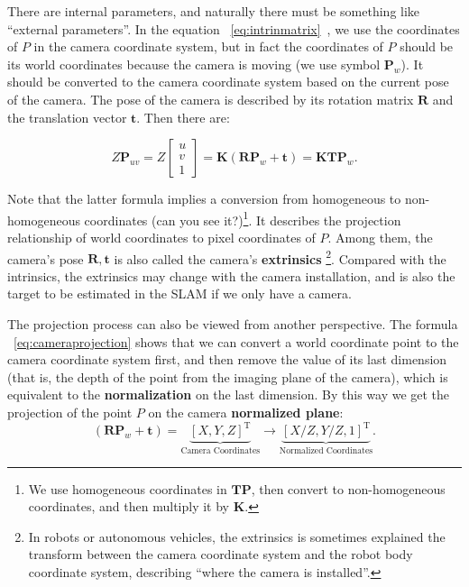 There are internal parameters, and naturally there must be something like ``external parameters''. In the equation ~\eqref{eq:intrinmatrix}~, we use the coordinates of $P$ in the camera coordinate system, but in fact the  coordinates of $P$ should be its world coordinates because the camera is moving (we use symbol $\mathbf{P}_w$). It should be converted to the camera coordinate system based on the current pose of the camera. The pose of the camera is described by its rotation matrix $\mathbf{R}$ and the translation vector $\mathbf{t}$. Then there are:

\begin{equation}
\label{eq:cameraprojection}
Z \mathbf{P}_{uv}=
Z \left[ \begin{array}{l}
u\\
v\\
1
\end{array} \right] = \mathbf{K} \left( {\mathbf{R}{ \mathbf{P}_w} + \mathbf{t}} \right) =  \mathbf{K} \mathbf{T} \mathbf{P}_w .
\end{equation}

Note that the latter formula implies a conversion from homogeneous to non-homogeneous coordinates (can you see it?)\footnote{We use homogeneous coordinates in $\mathbf{T}\mathbf{P}$, then convert to non-homogeneous coordinates, and then multiply it by $\mathbf{K}$. }. It describes the projection relationship of world coordinates to pixel coordinates of $P$. Among them, the camera's pose $\mathbf{R}, \mathbf{t}$ is also called the camera's \textbf{extrinsics} \footnote{In robots or autonomous vehicles, the extrinsics is sometimes explained the transform between the camera coordinate system and the robot body coordinate system, describing ``where the camera is installed''. }. Compared with the intrinsics, the extrinsics may change with the camera installation, and is also the target to be estimated in the SLAM if we only have a camera.

The projection process can also be viewed from another perspective. The formula ~\eqref{eq:cameraprojection} shows that we can convert a world coordinate point to the camera coordinate system first, and then remove the value of its last dimension (that is, the depth of the point from the imaging plane of the camera), which is equivalent to the \textbf{normalization} on the last dimension. By this way we get the projection of the point $P$ on the camera \textbf{normalized plane}:
\begin{equation}
\left( {\mathbf{R}{\mathbf{P}_w} + \mathbf{t}} \right) = \underbrace{\left[ X,Y,Z\right]^\mathrm{T}}_{\text{Camera Coordinates}} \to \underbrace {\left[ {X/Z,Y/Z,1} \right]^\mathrm{T}}_{\text{Normalized Coordinates}}.
\end{equation}

